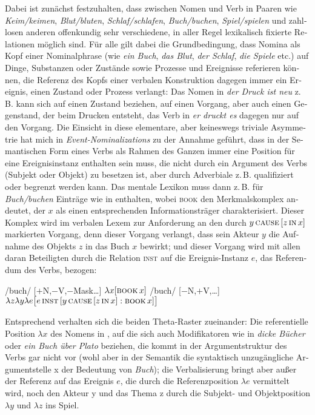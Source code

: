 \documentclass[output=paper,colorlinks,citecolor=brown]{langscibook}
\begin{document}
\begin{otherlanguage}{german}
\noindent Dabei ist zunächst festzuhalten, dass zwischen Nomen und Verb in Paaren wie \textit{Keim/keimen}, \textit{Blut/bluten}, \textit{Schlaf/schlafen}, \textit{Buch/buchen}, \textit{Spiel/spielen} und zahllosen anderen offenkundig sehr verschiedene, in aller Regel lexikalisch fixierte Relationen möglich sind. Für alle gilt dabei die Grundbedingung, dass Nomina als Kopf einer Nominalphrase (wie \textit{ein Buch}, \textit{das Blut}, \textit{der Schlaf}, \textit{die Spiele} etc.) auf Dinge, Substanzen oder Zustände sowie Prozesse und Ereignisse referieren können, die Referenz des Kopfs einer verbalen Konstruktion dagegen immer ein Ereignis, einen Zustand oder Prozess verlangt: Das Nomen in \textit{der Druck ist neu} z.\,B. kann sich auf einen Zustand beziehen, auf einen Vorgang, aber auch einen Gegenstand, der beim Drucken entsteht, das Verb in \textit{er druckt es} dagegen nur auf den Vorgang. Die Einsicht in diese elementare, aber keineswegs triviale Asymmetrie hat mich in \textit{Event-Nominalizations} \citep{Bierwisch1990} zu der Annahme geführt, dass in der Semantischen Form eines Verbs als Rahmen des Ganzen immer eine Position für eine Ereignisinstanz enthalten sein muss, die nicht durch ein Argument des Verbs (Subjekt oder Objekt) zu besetzen ist, aber durch Adverbiale z.\,B. qualifiziert oder begrenzt werden kann. Das mentale Lexikon muss dann z.\,B. für \textit{Buch/buchen} Einträge wie in  enthalten, wobei \textsc{book} den Merkmalskomplex andeutet, der $x$ als einen entsprechenden Informationsträger charakterisiert. Dieser Komplex wird im verbalen Lexem  zur Anforderung an den durch $y\, \textsc{cause}\, [ z\, \textsc{in}\, x ]$ markierten Vorgang, denn dieser Vorgang verlangt, dass sein Akteur $y$ die Aufnahme des Objekts $z$ in das Buch $x$ bewirkt; und dieser Vorgang wird mit allen daran Beteiligten durch die Relation \textsc{inst} auf die Ereignis-Instanz $e$, das Referendum des Verbs, bezogen:

\ea
\ea /buch/ [$+$N,$-$V,$-$Mask\dots] $\lambda x [ \textsc{book}\, x ]$
\label{ex:13a}
\ex /buch/ [$-$N,$+$V,\dots]\phantom{rask\ldots]} $\lambda z \lambda y \lambda e \big\lbrack e\, \textsc{inst}\, [ y\, \textsc{cause}\, [ z\, \textsc{in}\, x ] : \textsc{book}\, x ]\big\rbrack$
\label{ex:13b}
\z
\label{ex:13}
\z 

\noindent Entsprechend verhalten sich die beiden Theta-Raster zueinander: Die re\-fe\-ren\-tiel\-le Position $\lambda x$ des Nomens in , auf die sich auch Modifikatoren wie in \textit{dicke Bücher} oder \textit{ein Buch über Plato} beziehen, die kommt in der Argumentstruktur des Verbs gar nicht vor (wohl aber in der Semantik die syntaktisch unzugängliche Argumentstelle x der Bedeutung von \textit{Buch}); die Verbalisierung bringt aber außer der Referenz auf das Ereignis $e$, die durch die Referenzposition $\lambda e$ vermittelt wird, noch den Akteur y und das Thema z durch die Subjekt- und Objektposition $\lambda y$ und $\lambda z$ ins Spiel.


\end{otherlanguage}
\end{document}
